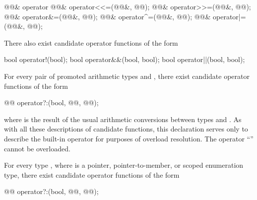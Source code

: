 \begin{codeblock}
@@&   operator%
@@&   operator<<=(@@&, @@);
@@&   operator>>=(@@&, @@);
@@&   operator&=(@@&, @@);
@@&   operator^=(@@&, @@);
@@&   operator|=(@@&, @@);
\end{codeblock}

\pnum
There also exist candidate operator functions of the form

\begin{codeblock}
bool    operator!(bool);
bool    operator&&(bool, bool);
bool    operator||(bool, bool);
\end{codeblock}

\pnum
For every pair of promoted arithmetic types
and
,
there exist candidate operator functions of the form

\begin{codeblock}
@@      operator?:(bool, @@, @@);
\end{codeblock}

where
is the result of the usual arithmetic conversions between types
and
.
\enternote
As with all these descriptions of candidate functions, this declaration serves
only to describe the built-in operator for purposes of overload resolution.
The operator
``''
cannot be overloaded.
\exitnote

\pnum
For every type
,
where
is a pointer, pointer-to-member, or scoped enumeration type, there exist candidate operator
functions of the form

\begin{codeblock}
@@       operator?:(bool, @@, @@);
\end{codeblock}%
